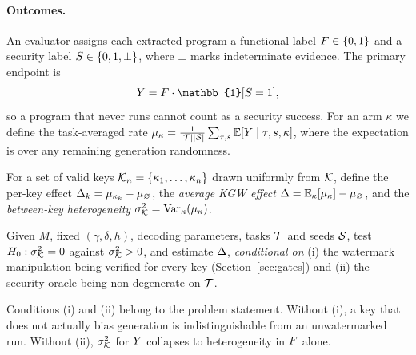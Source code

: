 \paragraph{Outcomes.} An evaluator assigns each extracted program a functional label $F\in\{0,1\}$ and a security label $S\in\{0,1,\bot\}$, where $\bot$ marks indeterminate evidence. The primary endpoint is
\begin{equation}
\Y=\Fn\cdot\mathbb{1}[\Sec=1],
\label{eq:endpoint}
\end{equation}
so a program that never runs cannot count as a security success. For an arm $\kappa$ we define the task-averaged rate $\mu_\kappa=\frac{1}{|\mathcal{T}||\mathcal{S}|}\sum_{\tau,s}\mathbb{E}[Y\mid\tau,s,\kappa]$, where the expectation is over any remaining generation randomness.

\begin{definition}[Estimands]\label{def:estimands}
For a set of valid keys $\mathcal{K}_n=\{\kappa_1,\dots,\kappa_n\}$ drawn uniformly from $\mathcal{K}$, define the per-key effect $\Delta_k=\mu_{\kappa_k}-\mu_\varnothing$, the \emph{average KGW effect} $\Delta=\mathbb{E}_{\kappa}[\mu_\kappa]-\mu_\varnothing$, and the \emph{between-key heterogeneity} $\sigma^2_{\mathcal{K}}=\operatorname{Var}_{\kappa}(\mu_\kappa)$.
\end{definition}

\begin{definition}\label{def:problem}
Given $M$, fixed $(\gamma,\delta,h)$, decoding parameters, tasks $\mathcal{T}$ and seeds $\mathcal{S}$, test $H_0:\sigma^2_{\mathcal{K}}=0$ against $\sigma^2_{\mathcal{K}}>0$, and estimate $\Delta$, \emph{conditional on} (i) the watermark manipulation being verified for every key (Section~\ref{sec:gates}) and (ii) the security oracle being non-degenerate on $\mathcal{T}$.
\end{definition}

Conditions (i) and (ii) belong to the problem statement. Without (i), a key that does not actually bias generation is indistinguishable from an unwatermarked run. Without (ii), $\sigma^2_{\mathcal{K}}$ for $Y$ collapses to heterogeneity in $F$ alone.
